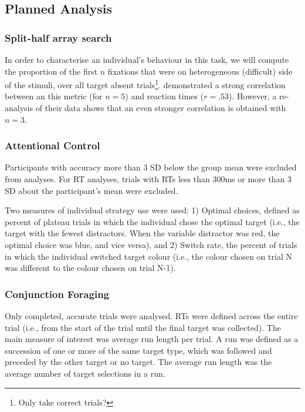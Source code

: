 \documentclass[]{rsos}%
\begin{document}

\subsection{Planned Analysis}

\subsubsection{Split-half array search}

In order to characterise an individual's behaviour in this task, we will compute the proportion of the first $n$ fixations that were on heterogeneous (difficult) side of the stimuli, over all target absent trials\footnote{Only take correct trials?}. \cite{nowakowsak2017} demonstrated a strong correlation between an this metric (for $n=5$) and reaction times ($r=.53$). However, a re-analysis of their data shows that an even stronger correlation is obtained with $n=3$.

\subsubsection{Attentional Control}

Participants with accuracy more than 3 SD below the group mean were excluded from analyses. For RT analyses, trials with RTs less than 300ms or more than 3 SD about the participant's mean were excluded. 

Two measures of individual strategy use were used: 1) Optimal choices, defined as percent of plateau trials in which the individual chose the optimal target (i.e., the target with the fewest distractors. When the variable distractor was red, the optimal choice was blue, and vice versa), and 2) Switch rate, the percent of trials in which the individual switched target colour (i.e., the colour chosen on trial N was different to the colour chosen on trial N-1).  

\subsubsection{Conjunction Foraging}

Only completed, accurate trials were analysed. RTs were defined across the entire trial (i.e., from the start of the trial until the final target was collected). The main measure of interest was average run length per trial. A run was defined as a succession of one or more of the same target type, which was followed and preceded by the other target or no target. The average run length was the average number of target selections in a run. 
\end{document}
